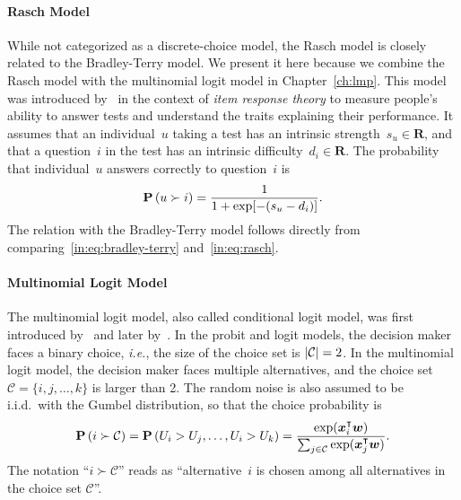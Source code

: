 \paragraph{Rasch Model}
While not categorized as a discrete-choice model, the Rasch model is closely related to the Bradley-Terry model.
We present it here because we combine the Rasch model with the multinomial logit model in Chapter~\ref{ch:lmp}.
This model was introduced by~\citet{rasch1993probabilistic} in the context of \emph{item response theory} to measure people's ability to answer tests and understand the traits explaining their performance.
It assumes that an individual~$u$ taking a test has an intrinsic strength~$s_u \in \mathbf{R}$, and that a question~$i$ in the test has an intrinsic difficulty~$d_i \in \mathbf{R}$.
The probability that individual~$u$ answers correctly to question~$i$ is
\begin{equation}
	\label{in:eq:rasch}
	\mathbf{P}\left( u \succ i \right) = \frac{1}{1 + \exp[-(s_u - d_i)]}.
\end{equation}
The relation with the Bradley-Terry model follows directly from comparing~\eqref{in:eq:bradley-terry} and~\eqref{in:eq:rasch}.

\paragraph{Multinomial Logit Model}

The multinomial logit model, also called conditional logit model, was first introduced by~\citet{luce1959individual} and later by~\citet{mcfadden1973conditional}.
In the probit and logit models, the decision maker faces a binary choice, \textit{i.e.}, the size of the choice set is $\lvert\mathcal{C}\rvert = 2$.
In the multinomial logit model, the decision maker faces multiple alternatives, and the choice set $\mathcal{C} = \{ i, j, \ldots, k \}$ is larger than 2.
The random noise is also assumed to be i.i.d.\ with the Gumbel distribution, so that the choice probability is
\begin{equation}
	\label{in:eq:multinomiallogit}
	\mathbf{P}\left( i \succ \mathcal{C} \right) = \mathbf{P}\left( U_i > U_j, \ldots, U_i > U_k \right) = \frac{\exp(\bm{x}_i^\intercal \bm{w})}{\sum_{j \in \mathcal{C}} \exp(\bm{x}_j^\intercal \bm{w})}.
\end{equation}
The notation ``$i \succ \mathcal{C}$'' reads as ``alternative~$i$ is chosen among all alternatives in the choice set $\mathcal{C}$''.

